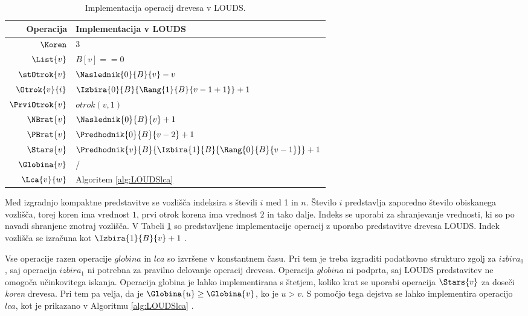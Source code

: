 \begin{table}[htb]
    \centering
    \caption{Implementacija operacij drevesa v LOUDS.}
    \begin{tabular}{r|l}
\textbf{Operacija}& \textbf{Implementacija v LOUDS} \\\hline
         $\Koren$ &         3\\
         $\List{v}$ &       $B[v]==0$\\
         $\stOtrok{v}$&     $\Naslednik{0}{B}{v}-v$\\
         $\Otrok{v}{i}$ &   $\Izbira{0}{B}{\Rang{1}{B}{v-1+1}}+1$\\
         $\PrviOtrok{v}$&   $otrok(v,1)$\\
         $\NBrat{v}$ &      $\Naslednik{0}{B}{v}+1$ \\
         $\PBrat{v}$ &      $\Predhodnik{0}{B}{v-2}+1$ \\
         $\Stars{v}$ &      $\Predhodnik{v}{B}{\Izbira{1}{B}{\Rang{0}{B}{v-1}}}+1$ \\
         $\Globina{v}$ &        / \\
         $\Lca{v}{w}$ &     Algoritem \ref{alg:LOUDSlca}\\

    \end{tabular}
    \label{tab:LOUDSop}
\end{table}

Med izgradnjo kompaktne predstavitve se vozlišča indeksira s števili $i$ med 1 in $n$. Število $i$ predstavlja zaporedno število obiskanega vozlišča, torej koren ima vrednost $1$, prvi otrok korena ima vrednost $2$ in tako dalje. Indeks se uporabi za shranjevanje vrednosti, ki so po navadi shranjene znotraj vozlišča. V Tabeli \ref{tab:LOUDSop} so predstavljene implementacije operacij z uporabo predstavitve drevesa LOUDS. Indek vozlišča se izračuna kot $\Izbira{1}{B}{v}+1$ \cite{Navarro2016}.


Vse operacije razen operacije $globina$ in $lca$ so izvršene v konstantnem času. Pri tem je treba izgraditi podatkovno strukturo zgolj za $izbira_0$, saj operacija $izbira_1$ ni potrebna za pravilno delovanje operacij drevesa. Operacija $globina$ ni podprta, saj LOUDS predstavitev ne omogoča učinkovitega iskanja. Operacija globina je lahko implementirana s štetjem, koliko krat se uporabi operacija $\Stars{v}$ za doseči \textit{koren} drevesa. Pri tem  pa velja, da je $\Globina{u}\ge\Globina{v}$, ko je $u>v$. S pomočjo tega dejstva se lahko implementira operacijo $lca$, kot je prikazano v Algoritmu \ref{alg:LOUDSlca} \cite{Navarro2016}.
 
